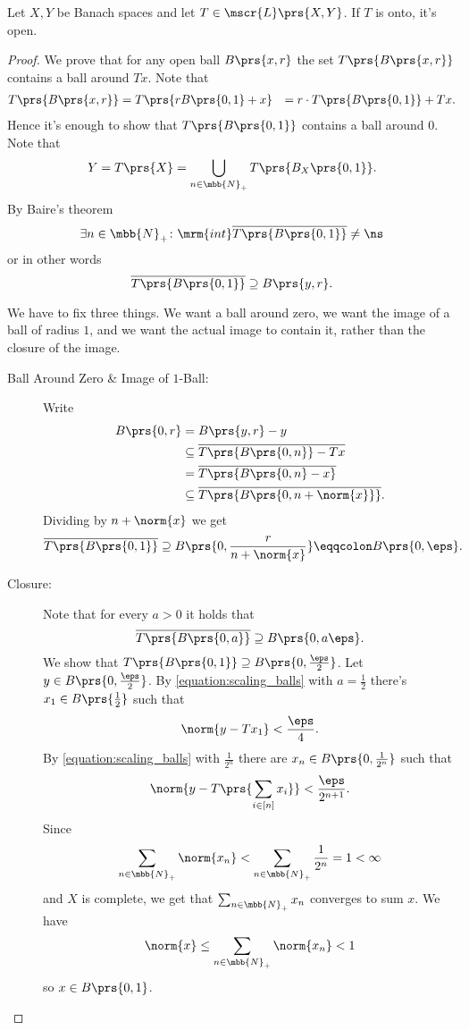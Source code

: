 \documentclass[10pt, twoside]{book}
\begin{document}
\begin{theorem}
Let $X,Y$ be Banach spaces and let $T \in \mscr{L}\prs{X,Y}$. If $T$ is onto, it's open.
\end{theorem}

\begin{proof}
We prove that for any open ball $B\prs{x,r}$ the set $T\prs{B\prs{x,r}}$ contains a ball around $Tx$.
Note that
\begin{align*}
T\prs{B\prs{x,r}} &= T\prs{r B\prs{0,1} + x}
&= r\cdot T\prs{B\prs{0,1}} + Tx \text{.}
\end{align*}
Hence it's enough to show that $T\prs{B\prs{0,1}}$ contains a ball around $0$.
Note that
\[Y = T\prs{X} = \bigcup_{n \in \mbb{N}_+} T\prs{B_X\prs{0,1}} \text{.}\]
By Baire's theorem
\[\exists n \in \mbb{N}_+ \colon \mrm{int} \overline{T\prs{B\prs{0,1}}} \neq \ns\]
or in other words
\[\overline{T\prs{B\prs{0,1}}} \supseteq B\prs{y,r} \text{.}\]

We have to fix three things. We want a ball around zero, we want the image of a ball of radius $1$, and we want the actual image to contain it, rather than the closure of the image.

\begin{description}
\item[Ball Around Zero \& Image of $1$-Ball:]
Write
\begin{align*}
B\prs{0,r} &= B\prs{y,r} - y
\\&\subseteq \overline{T\prs{B\prs{0,n}} - Tx}
\\&=
\overline{T\prs{B\prs{0,n} - x}}
\\&\subseteq
\overline{T\prs{B\prs{0,n+\norm{x}}}} \text{.}
\end{align*}
Dividing by $n + \norm{x}$ we get
\begin{align*}
\overline{T\prs{B\prs{0,1}}} \supseteq B\prs{0, \frac{r}{n + \norm{x}}} \eqqcolon B\prs{0,\eps} \text{.}
\end{align*}

\item[Closure:]
Note that for every $a > 0$ it holds that
\begin{equation} \label{equation:scaling_balls}
\overline{T\prs{B\prs{0,a}}} \supseteq B\prs{0,a \eps} \text{.}
\end{equation}
We show that $T\prs{B\prs{0,1}} \supseteq B\prs{0,\frac{\eps}{2}}$.
Let $y \in B\prs{0, \frac{\eps}{2}}$. By \eqref{equation:scaling_balls} with $a = \frac{1}{2}$ there's $x_1 \in B\prs{\frac{1}{2}}$ such that
\[\norm{y - Tx_1} < \frac{\eps}{4} \text{.}\]
By \eqref{equation:scaling_balls} with $\frac{1}{2^n}$ there are $x_n \in B\prs{0, \frac{1}{2^n}}$ such that
\begin{equation}\label{equation:open_mapping_approximation}
\norm{y - T\prs{\sum_{i\in[n]} x_i}} < \frac{\eps}{2^{n+1}} \text{.}
\end{equation}
Since \[\sum_{n \in \mbb{N}_+} \norm{x_n} < \sum_{n \in \mbb{N}_+} \frac{1}{2^n} = 1 < \infty\]
and $X$ is complete, we get that
$\sum_{n \in \mbb{N}_+} x_n$ converges to sum $x$.
We have
\[\norm{x} \leq \sum_{n \in \mbb{N}_+} \norm{x_n} < 1\]
so $x \in B\prs{0,1}$.


\end{description}
\end{proof}
\end{document}
